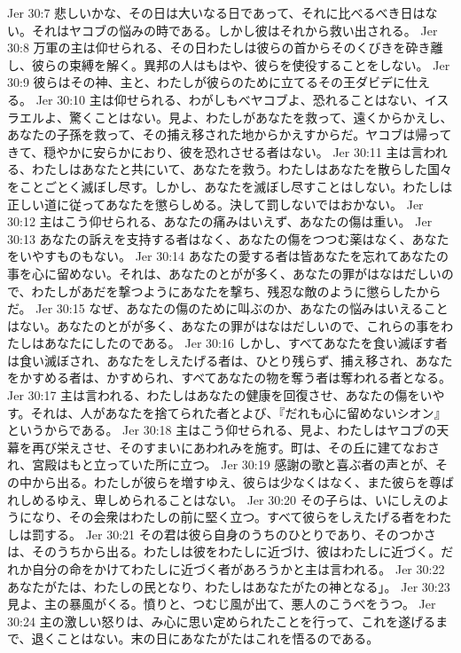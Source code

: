 Jer 30:7  悲しいかな、その日は大いなる日であって、それに比べるべき日はない。それはヤコブの悩みの時である。しかし彼はそれから救い出される。
Jer 30:8  万軍の主は仰せられる、その日わたしは彼らの首からそのくびきを砕き離し、彼らの束縛を解く。異邦の人はもはや、彼らを使役することをしない。
Jer 30:9  彼らはその神、主と、わたしが彼らのために立てるその王ダビデに仕える。
Jer 30:10  主は仰せられる、わがしもべヤコブよ、恐れることはない、イスラエルよ、驚くことはない。見よ、わたしがあなたを救って、遠くからかえし、あなたの子孫を救って、その捕え移された地からかえすからだ。ヤコブは帰ってきて、穏やかに安らかにおり、彼を恐れさせる者はない。
Jer 30:11  主は言われる、わたしはあなたと共にいて、あなたを救う。わたしはあなたを散らした国々をことごとく滅ぼし尽す。しかし、あなたを滅ぼし尽すことはしない。わたしは正しい道に従ってあなたを懲らしめる。決して罰しないではおかない。
Jer 30:12  主はこう仰せられる、あなたの痛みはいえず、あなたの傷は重い。
Jer 30:13  あなたの訴えを支持する者はなく、あなたの傷をつつむ薬はなく、あなたをいやすものもない。
Jer 30:14  あなたの愛する者は皆あなたを忘れてあなたの事を心に留めない。それは、あなたのとがが多く、あなたの罪がはなはだしいので、わたしがあだを撃つようにあなたを撃ち、残忍な敵のように懲らしたからだ。
Jer 30:15  なぜ、あなたの傷のために叫ぶのか、あなたの悩みはいえることはない。あなたのとがが多く、あなたの罪がはなはだしいので、これらの事をわたしはあなたにしたのである。
Jer 30:16  しかし、すべてあなたを食い滅ぼす者は食い滅ぼされ、あなたをしえたげる者は、ひとり残らず、捕え移され、あなたをかすめる者は、かすめられ、すべてあなたの物を奪う者は奪われる者となる。
Jer 30:17  主は言われる、わたしはあなたの健康を回復させ、あなたの傷をいやす。それは、人があなたを捨てられた者とよび、『だれも心に留めないシオン』というからである。
Jer 30:18  主はこう仰せられる、見よ、わたしはヤコブの天幕を再び栄えさせ、そのすまいにあわれみを施す。町は、その丘に建てなおされ、宮殿はもと立っていた所に立つ。
Jer 30:19  感謝の歌と喜ぶ者の声とが、その中から出る。わたしが彼らを増すゆえ、彼らは少なくはなく、また彼らを尊ばれしめるゆえ、卑しめられることはない。
Jer 30:20  その子らは、いにしえのようになり、その会衆はわたしの前に堅く立つ。すべて彼らをしえたげる者をわたしは罰する。
Jer 30:21  その君は彼ら自身のうちのひとりであり、そのつかさは、そのうちから出る。わたしは彼をわたしに近づけ、彼はわたしに近づく。だれか自分の命をかけてわたしに近づく者があろうかと主は言われる。
Jer 30:22  あなたがたは、わたしの民となり、わたしはあなたがたの神となる」。
Jer 30:23  見よ、主の暴風がくる。憤りと、つむじ風が出て、悪人のこうべをうつ。
Jer 30:24  主の激しい怒りは、み心に思い定められたことを行って、これを遂げるまで、退くことはない。末の日にあなたがたはこれを悟るのである。

